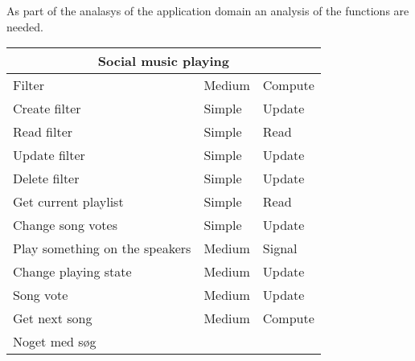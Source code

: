 As part of the analasys of the application domain an analysis of the functions are needed.
\begin{table}[h]
\begin{tabular}{lll}
\hline
\multicolumn{3}{c}{\textbf{Social music playing}} \\ \hline
Filter                         & Medium & Compute \\
Create filter                  & Simple & Update  \\
Read filter                    & Simple & Read    \\
Update filter                  & Simple & Update  \\
Delete filter                  & Simple & Update  \\
Get current playlist           & Simple & Read    \\
Change song votes              & Simple & Update  \\
Play something on the speakers & Medium & Signal  \\
Change playing state           & Medium & Update  \\
Song vote                      & Medium & Update  \\
Get next song                  & Medium & Compute \\
Noget med søg                  &        &         \\ \hline
\end{tabular}
\end{table}